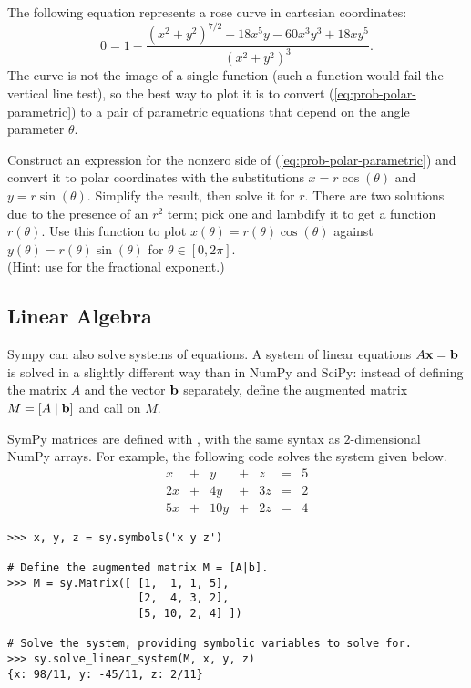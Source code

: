 \begin{problem}
The following equation represents a rose curve in cartesian coordinates:
\begin{equation}
0 = 1 - \frac{(x^2 + y^2)^{7/2} + 18x^5 y - 60x^3 y^3 + 18xy^5}{(x^2 + y^2)^3}.
\label{eq:prob-polar-parametric}
\end{equation}
The curve is not the image of a single function (such a function would fail the vertical line test), so the best way to plot it is to convert (\ref{eq:prob-polar-parametric}) to a pair of parametric equations that depend on the angle parameter $\theta$.

Construct an expression for the nonzero side of (\ref{eq:prob-polar-parametric}) and convert it to polar coordinates with the substitutions $x = r\cos(\theta)$ and $y = r\sin(\theta)$.
Simplify the result, then solve it for $r$.
There are two solutions due to the presence of an $r^2$ term; pick one and lambdify it to get a function $r(\theta)$.
Use this function to plot $x(\theta) = r(\theta)\cos(\theta)$ against $y(\theta) = r(\theta)\sin(\theta)$ for $\theta \in [0,2\pi]$.
\\(Hint: use  for the fractional exponent.)
\end{problem}

\subsection*{Linear Algebra} %

Sympy can also solve systems of equations.
A system of linear equations $A\mathbf{x} = \mathbf{b}$ is solved in a slightly different way than in NumPy and SciPy: instead of defining the matrix $A$ and the vector $\mathbf{b}$ separately, define the augmented matrix $M = [A\mid\mathbf{b}]$ and call  on $M$.

SymPy matrices are defined with , with the same syntax as $2$-dimensional NumPy arrays.
For example, the following code solves the system given below.
\[
\begin{array}{rrrrrrr}
 x & + &   y & + &  z & = & 5 \\
2x & + &  4y & + & 3z & = & 2 \\
5x & + & 10y & + & 2z & = & 4
\end{array}
\]
\begin{lstlisting}
>>> x, y, z = sy.symbols('x y z')

# Define the augmented matrix M = [A|b].
>>> M = sy.Matrix([ [1,  1, 1, 5],
                    [2,  4, 3, 2],
                    [5, 10, 2, 4] ])

# Solve the system, providing symbolic variables to solve for.
>>> sy.solve_linear_system(M, x, y, z)
{x: 98/11, y: -45/11, z: 2/11}
\end{lstlisting}

